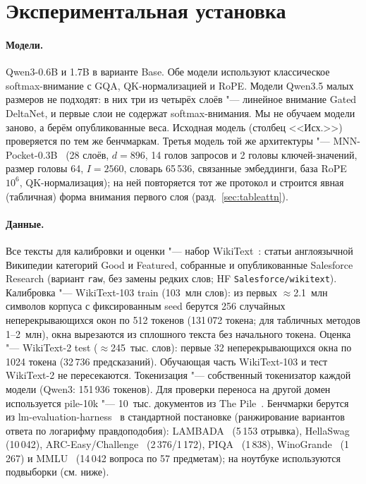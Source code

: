 \section{Экспериментальная установка}\label{sec:setup}

\paragraph{Модели.} Qwen3-0.6B и 1.7B в варианте Base. Обе модели используют классическое softmax-внимание с GQA,
QK-нормализацией и RoPE. Модели Qwen3.5 малых размеров не подходят:
в них три из четырёх слоёв "--- линейное внимание Gated DeltaNet, и
первые слои не содержат softmax-внимания. Мы не обучаем модели
заново, а берём опубликованные веса. Исходная модель (столбец <<Исх.>>)
проверяется по тем же бенчмаркам. Третья модель той же архитектуры "---
MNN-Pocket-0.3B~\cite{mnnpocket2026} (28 слоёв, $d=896$, 14 голов запросов и 2 головы
ключей-значений, размер головы 64, $I=2560$, словарь 65\,536, связанные эмбеддинги,
база RoPE $10^6$, QK-нормализация); на ней повторяется тот же протокол и строится
явная (табличная) форма внимания первого слоя (разд.~\ref{sec:tableattn}).

\paragraph{Данные.} Все тексты для калибровки и оценки "--- набор
WikiText~\cite{merity2017pointer}: статьи англоязычной Википедии категорий
Good и Featured, собранные и опубликованные Salesforce Research
(вариант \texttt{raw}, без замены редких слов; HF \texttt{Salesforce/wikitext}).
Калибровка "--- WikiText-103 train (103~млн слов): из первых $\approx$2.1~млн символов
корпуса с фиксированным seed берутся 256 случайных неперекрывающихся окон по 512 токенов
(131\,072 токена; для табличных методов 1--2~млн), окна вырезаются из сплошного
текста без начального токена. Оценка "--- WikiText-2 test ($\approx$245~тыс. слов):
первые 32 неперекрывающихся окна по 1024 токена (32\,736 предсказаний).
Обучающая часть WikiText-103 и тест WikiText-2 не пересекаются. Токенизация "---
собственный токенизатор каждой модели (Qwen3: 151\,936 токенов). Для проверки
переноса на другой домен используется pile-10k "--- 10~тыс. документов из The
Pile~\cite{gao2020pile}. Бенчмарки берутся из lm-evaluation-harness~\cite{gao2023harness}
в стандартной постановке (ранжирование вариантов ответа по логарифму правдоподобия):
LAMBADA~\cite{paperno2016lambada} (5\,153 отрывка), HellaSwag~\cite{zellers2019hellaswag}
(10\,042), ARC-Easy/Challenge~\cite{clark2018arc} (2\,376/1\,172), PIQA~\cite{bisk2020piqa}
(1\,838), WinoGrande~\cite{sakaguchi2020winogrande} (1\,267) и MMLU~\cite{hendrycks2021mmlu}
(14\,042 вопроса по 57 предметам); на ноутбуке используются подвыборки (см. ниже).

